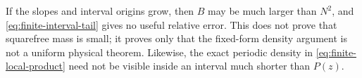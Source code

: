 \begin{remark}
\label{rem:tail-bound-limitation}
If the slopes and interval origins grow, then \(B\) may be much
larger than \(N^2\), and \eqref{eq:finite-interval-tail} gives no
useful relative error.  This does not prove that squarefree mass is
small; it proves only that the fixed-form density argument is not a
uniform physical theorem.  Likewise, the exact periodic density in
\eqref{eq:finite-local-product} need not be visible inside an
interval much shorter than \(P(z)\).
\end{remark}
